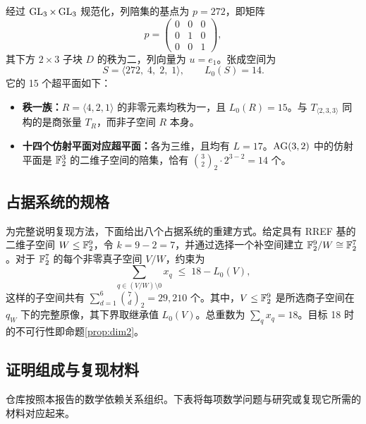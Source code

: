 \documentclass[11pt,a4paper]{article}
\begin{document}
经过 $\operatorname{GL}_3\times\operatorname{GL}_3$ 规范化，列陪集的基点为 $p=272$，即矩阵
\[
  p=\begin{pmatrix}0&0&0\\0&1&0\\0&0&1\end{pmatrix},
\]
其下方 $2\times3$ 子块 $D$ 的秩为二，列向量为 $u=e_1$。张成空间为
\[
  S=\langle272,\;4,\;2,\;1\rangle,\qquad L_0(S)=14.
\]
它的 15 个超平面如下：
\begin{itemize}
  \item \textbf{秩一族：}$R=\langle4,2,1\rangle$ 的非零元素均秩为一，且 $L_0(R)=15$。与 $T_{\langle2,3,3\rangle}$ 同构的是商张量 $T_R$，而非子空间 $R$ 本身。
  \item \textbf{十四个仿射平面对应超平面：}各为三维，且均有 $L=17$。$\operatorname{AG}(3,2)$ 中的仿射平面是 $\mathbb{F}_2^3$ 的二维子空间的陪集，恰有 $\binom{3}{2}_2\cdot2^{3-2}=14$ 个。
\end{itemize}

\subsection{占据系统的规格}

为完整说明复现方法，下面给出八个占据系统的重建方式。给定具有 RREF 基的二维子空间 $W\le\mathbb{F}_2^9$，令 $k=9-2=7$，并通过选择一个补空间建立 $\mathbb{F}_2^9/W\cong\mathbb{F}_2^7$。对于 $\mathbb{F}_2^7$ 的每个非零真子空间 $V/W$，约束为
\[
  \sum_{q\in(V/W)\setminus0}x_q\;\le\;18-L_0(V),
\]
这样的子空间共有 $\sum_{d=1}^{6}\binom{7}{d}_2=29{,}210$ 个。其中，$V\le\mathbb{F}_2^9$ 是所选商子空间在 $q_W$ 下的完整原像，其下界取继承值 $L_0(V)$。总重数为 $\sum_qx_q=18$。目标 18 时的不可行性即命题\ref{prop:dim2}。

\subsection{证明组成与复现材料}\label{app:repository}

仓库按照本报告的数学依赖关系组织。下表将每项数学问题与研究或复现它所需的材料对应起来。
\end{document}

